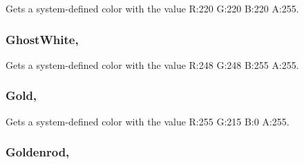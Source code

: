 Gets a system-\/defined color with the value R\+:220 G\+:220 B\+:220 A\+:255.

\hypertarget{structMicrosoft_1_1Xna_1_1Framework_1_1Color_a7e7f36952fc2c630bb0cef197a348e54}{}
\subsubsection[{Ghost\+White}]{ Ghost\+White\hspace{0.3cm}{\ttfamily [static]}, {\ttfamily [get]}}\label{structMicrosoft_1_1Xna_1_1Framework_1_1Color_a7e7f36952fc2c630bb0cef197a348e54}


Gets a system-\/defined color with the value R\+:248 G\+:248 B\+:255 A\+:255.

\hypertarget{structMicrosoft_1_1Xna_1_1Framework_1_1Color_a76ff7ba14dac650100e7443037c66759}{}
\subsubsection[{Gold}]{ Gold\hspace{0.3cm}{\ttfamily [static]}, {\ttfamily [get]}}\label{structMicrosoft_1_1Xna_1_1Framework_1_1Color_a76ff7ba14dac650100e7443037c66759}


Gets a system-\/defined color with the value R\+:255 G\+:215 B\+:0 A\+:255.

\hypertarget{structMicrosoft_1_1Xna_1_1Framework_1_1Color_afd5a04aefaec58f43dcbe2cddd08bf01}{}
\subsubsection[{Goldenrod}]{ Goldenrod\hspace{0.3cm}{\ttfamily [static]}, {\ttfamily [get]}}\label{structMicrosoft_1_1Xna_1_1Framework_1_1Color_afd5a04aefaec58f43dcbe2cddd08bf01}


